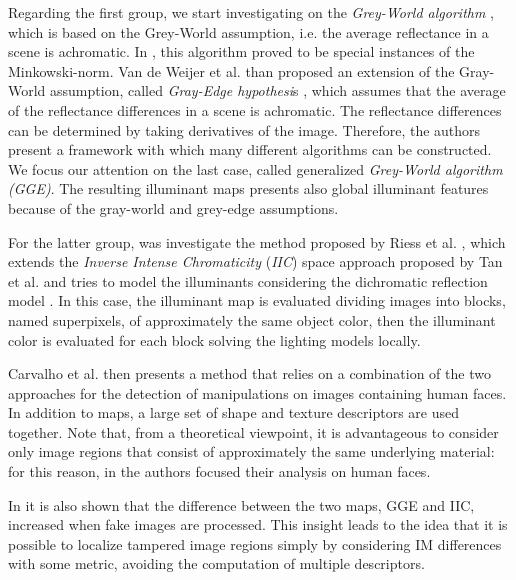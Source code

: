 Regarding the first group, we start investigating on the \emph{Grey-World algorithm} \cite{Buchsbaum19801}, which is based on the Grey-World assumption, i.e. the average reflectance in a scene is achromatic. In \cite{finlayson2004shades}, this algorithm proved to be special instances of the Minkowski-norm. Van de Weijer et al. \cite{van2007edge} than proposed an extension of the Gray-World assumption, called \emph{Gray-Edge hypothesi}s \cite{van2007edge}, which assumes that the average of the reflectance differences in a scene is achromatic. The reflectance differences can be determined by taking derivatives of the image. Therefore, the authors present a framework with which many different algorithms can be constructed.
We focus our attention on the last case, called generalized \emph{Grey-World algorithm (GGE)}. The resulting illuminant maps presents also global illuminant features because of the gray-world and grey-edge assumptions.

For the latter group, was investigate the method proposed by Riess et al. \cite{riess2010scene}, which extends the \emph{Inverse Intense Chromaticity} (\emph{IIC}) space approach proposed by Tan et al. \cite{tan2004color} and tries to model the illuminants considering the dichromatic reflection model \cite{tominaga1989standard}. In this case, the illuminant map is evaluated dividing  images into blocks, named superpixels, of approximately the same object color, then the illuminant color is evaluated for each block solving the lighting models locally. 

Carvalho et al. \cite{carvalho2016illuminant} then presents a method that relies on a combination of the two approaches for the detection of manipulations on images containing human faces. In addition to maps, a large set of shape and texture descriptors are used together. Note that, from a theoretical viewpoint, it is advantageous to consider only image regions that consist of approximately the same underlying material: for this reason, in \cite{carvalho2016illuminant} the authors focused their analysis on human faces.

In \cite{carvalho2016illuminant} it is also shown that the difference between the two maps, GGE and IIC, increased when fake images are processed. This insight leads to the idea that it is possible to localize tampered image regions simply by considering IM differences with some metric, avoiding the computation of multiple descriptors.